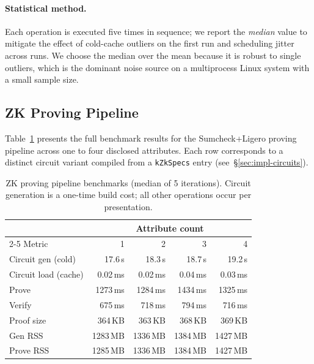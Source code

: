 \paragraph{Statistical method.}
Each operation is executed five times in sequence; we report the \emph{median} value to mitigate the effect of cold-cache outliers on the first run and scheduling jitter across runs.
We choose the median over the mean because it is robust to single outliers, which is the dominant noise source on a multiprocess Linux system with a small sample size.

\subsection{ZK Proving Pipeline}\label{sec:bench-zk}

Table~\ref{tab:zk-bench} presents the full benchmark results for the Sumcheck+Ligero proving pipeline across one to four disclosed attributes.
Each row corresponds to a distinct circuit variant compiled from a \texttt{kZkSpecs} entry (see~\S\ref{sec:impl-circuits}).

\begin{table}[t]
  \centering
  \caption{ZK proving pipeline benchmarks (median of 5 iterations).
           Circuit generation is a one-time build cost; all other operations occur per presentation.}\label{tab:zk-bench}
  \begin{tabular}{lrrrr}
    \toprule
    & \multicolumn{4}{c}{Attribute count} \\
    \cmidrule(lr){2-5}
    Metric & 1 & 2 & 3 & 4 \\
    \midrule
    Circuit gen (cold)     & 17.6\,s   & 18.3\,s   & 18.7\,s   & 19.2\,s   \\
    Circuit load (cache)   & 0.02\,ms  & 0.02\,ms  & 0.04\,ms  & 0.03\,ms  \\
    Prove                  & 1273\,ms  & 1284\,ms  & 1434\,ms  & 1325\,ms  \\
    Verify                 & 675\,ms   & 718\,ms   & 794\,ms   & 716\,ms   \\
    Proof size             & 364\,KB   & 363\,KB   & 368\,KB   & 369\,KB   \\
    Gen RSS                & 1283\,MB  & 1336\,MB  & 1384\,MB  & 1427\,MB  \\
    Prove RSS              & 1285\,MB  & 1336\,MB  & 1384\,MB  & 1427\,MB  \\
    \bottomrule
  \end{tabular}
\end{table}

